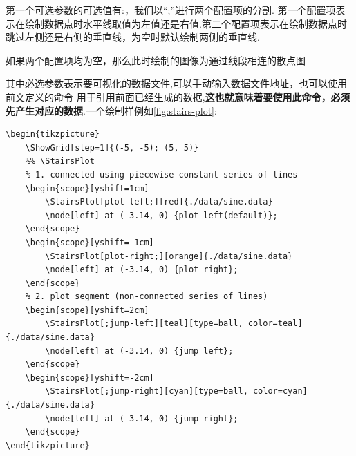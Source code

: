 第一个可选参数的可选值有:，我们以``;''进行两个配置项的分割.
第一个配置项表示在绘制数据点时水平线取值为左值还是右值.第二个配置项表示在绘制数据点时
跳过左侧还是右侧的垂直线，为空时默认绘制两侧的垂直线. 

\begin{remark}
    如果两个配置项均为空，那么此时绘制的图像为通过线段相连的散点图
\end{remark}

其中必选参数表示要可视化的数据文件,可以手动输入数据文件地址，也可以使用前文定义的命令
用于引用前面已经生成的数据,\textbf{这也就意味着要使用此命令，必须先产生对应的数据}.一个绘制样例如\cref{fig:stairs-plot}:

\begin{verbatim}
\begin{tikzpicture}
    \ShowGrid[step=1]{(-5, -5); (5, 5)}
    %% \StairsPlot
    % 1. connected using piecewise constant series of lines
    \begin{scope}[yshift=1cm]
        \StairsPlot[plot-left;][red]{./data/sine.data}
        \node[left] at (-3.14, 0) {plot left(default)};
    \end{scope}
    \begin{scope}[yshift=-1cm]
        \StairsPlot[plot-right;][orange]{./data/sine.data}
        \node[left] at (-3.14, 0) {plot right};
    \end{scope}
    % 2. plot segment (non-connected series of lines)      
    \begin{scope}[yshift=2cm]
        \StairsPlot[;jump-left][teal][type=ball, color=teal]{./data/sine.data}
        \node[left] at (-3.14, 0) {jump left};
    \end{scope}
    \begin{scope}[yshift=-2cm]
        \StairsPlot[;jump-right][cyan][type=ball, color=cyan]{./data/sine.data}
        \node[left] at (-3.14, 0) {jump right};
    \end{scope}
\end{tikzpicture}
\end{verbatim}

